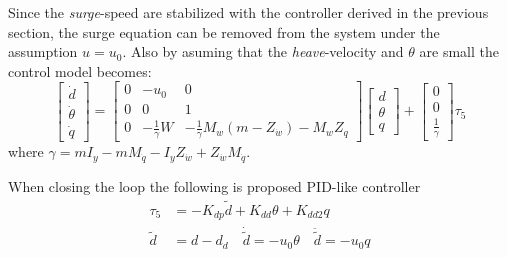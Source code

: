 		Since the \textit{surge}-speed are stabilized with the controller derived in the previous
		section, the surge equation can be removed from the system under the assumption $u = u_0$.		
		Also by asuming that the \textit{heave}-velocity and $\theta$ are small the control model
		becomes:
		\begin{equation}
			\left [ \begin{matrix}
					\dot{d} \\
					\dot{\theta} \\
					\dot{q} 
				\end{matrix}
				\right ] = \left [ \begin{matrix}
							0 & -u_0 &  0 \\
							0 & 0 &   1 \\
							0 & -\frac{1}{\gamma} W &-\frac{1}{\gamma}M_{w} (m - Z_{\dot{w}})-M_w Z_q
						\end{matrix} \right ] 
				\left [ \begin{matrix}
						d \\
						\theta \\
						q
					\end{matrix} \right] + \left [ \begin{matrix}
										0 \\
										0 \\
										\frac{1}{\gamma}
									\end{matrix} \right] \tau_5
		\end{equation}
		where $\gamma = m I_y - m M_{\dot{q}} - I_y Z_{\dot{w}} + Z_{\dot{w}} M_{\dot{q}}$.
		
		When closing the loop the following is proposed PID-like controller
		\begin{equation}
			\begin{aligned}
				\tau_5 &= -K_{dp} \tilde{d} + K_{dd}  \theta + K_{dd2} q \\
				\tilde{d} &= d - d_d \quad \dot{\tilde{d}} = -u_0\theta \quad
				\ddot{\tilde{d}} = -u_0q
			\end{aligned}
		\end{equation}
				

	
